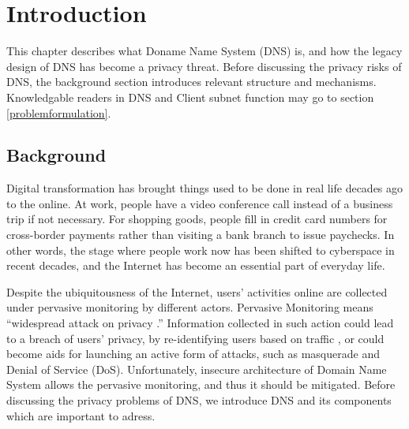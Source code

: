 \documentclass[a4paper,12pt]{article}
\begin{document}
\newpage
{}
\tableofcontents %
\newpage
{}

%
%

\section{Introduction}
This chapter describes what Doname Name System (DNS) is, and how the legacy design of DNS has become a privacy threat. Before discussing the privacy risks of DNS, the background section introduces relevant structure and mechanisms. Knowledgable readers in DNS and Client subnet function may go to section \ref{problemformulation}.

\subsection{Background}
Digital transformation has brought things used to be done in real life decades ago to the online. At work, people have a video conference call instead of a business trip if not necessary. For shopping goods, people fill in credit card numbers for cross-border payments rather than visiting a bank branch to issue paychecks. In other words, the stage where people work now has been shifted to cyberspace in recent decades, and the Internet has become an essential part of everyday life.

Despite the ubiquitousness of the Internet, users' activities online are collected under pervasive monitoring by different actors.
Pervasive Monitoring means ``widespread attack on privacy \cite{rfc7258}.'' Information collected in such action could lead to a breach of users’ privacy, by re-identifying users based on traffic \cite{herrmann2010analyzing}, or could become aids for launching an active form of attacks, such as masquerade and Denial of Service (DoS).
Unfortunately, insecure architecture of Domain Name System allows the pervasive monitoring, and thus it should be mitigated. Before discussing the privacy problems of DNS, we introduce DNS and its components which are important to adress.


\end{document}
